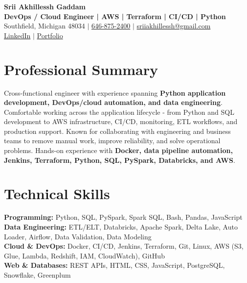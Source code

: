 \documentclass[letterpaper,10pt]{article}
\begin{document}
\fontsize{9.35pt}{10.45pt}\selectfont

\begin{center}
    {\LARGE \textbf{Srii Akhillessh Gaddam}} \\[-1pt]
    \textbf{DevOps / Cloud Engineer | AWS | Terraform | CI/CD | Python} \\[2pt]
    Southfield, Michigan 48034 $|$
    \href{tel:6468752400}{646-875-2400} $|$
    \href{mailto:sriiakhillessh@gmail.com}{sriiakhillessh@gmail.com} \\[1pt]
    \href{https://www.linkedin.com/in/srii-akhiilessh-gaddam-b48668191/}{LinkedIn} $|$
    \href{https://sriiakhillesshg.github.io/portfolio/}{Portfolio}
\end{center}
\vspace{-8pt}

\section{Professional Summary}
\small{Cross-functional engineer with experience spanning \textbf{Python application development, DevOps/cloud automation, and data engineering}. Comfortable working across the application lifecycle - from Python and SQL development to AWS infrastructure, CI/CD, monitoring, ETL workflows, and production support. Known for collaborating with engineering and business teams to remove manual work, improve reliability, and solve operational problems. Hands-on experience with \textbf{Docker, data pipeline automation, Jenkins, Terraform, Python, SQL, PySpark, Databricks, and AWS}.}

\section{Technical Skills}
\small{
\textbf{Programming:} Python, SQL, PySpark, Spark SQL, Bash, Pandas, JavaScript \\
\textbf{Data Engineering:} ETL/ELT, Databricks, Apache Spark, Delta Lake, Auto Loader, Airflow, Data Validation, Data Modeling \\
\textbf{Cloud \& DevOps:} Docker, CI/CD, Jenkins, Terraform, Git, Linux, AWS (S3, Glue, Lambda, Redshift, IAM, CloudWatch), GitHub \\
\textbf{Web \& Databases:} REST APIs, HTML, CSS, JavaScript, PostgreSQL, Snowflake, Greenplum
}
\end{document}
